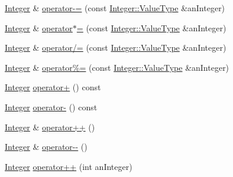 \begin{DoxyCompactItemize}
\item 
\mbox{\hyperlink{classlibrary_1_1core_1_1types_1_1_integer}{Integer}} \& \mbox{\hyperlink{classlibrary_1_1core_1_1types_1_1_integer_a3976d02296b294db2aa1b70164764fbc}{operator-\/=}} (const \mbox{\hyperlink{classlibrary_1_1core_1_1types_1_1_integer_a623afb1580f870fd8a1997b1c12c917d}{Integer\+::\+Value\+Type}} \&an\+Integer)
\item 
\mbox{\hyperlink{classlibrary_1_1core_1_1types_1_1_integer}{Integer}} \& \mbox{\hyperlink{classlibrary_1_1core_1_1types_1_1_integer_ac08d655daf7d75b22909e14aed294e7e}{operator$\ast$=}} (const \mbox{\hyperlink{classlibrary_1_1core_1_1types_1_1_integer_a623afb1580f870fd8a1997b1c12c917d}{Integer\+::\+Value\+Type}} \&an\+Integer)
\item 
\mbox{\hyperlink{classlibrary_1_1core_1_1types_1_1_integer}{Integer}} \& \mbox{\hyperlink{classlibrary_1_1core_1_1types_1_1_integer_a5358ac7b2be0f83ebd2fccb1e9593e24}{operator/=}} (const \mbox{\hyperlink{classlibrary_1_1core_1_1types_1_1_integer_a623afb1580f870fd8a1997b1c12c917d}{Integer\+::\+Value\+Type}} \&an\+Integer)
\item 
\mbox{\hyperlink{classlibrary_1_1core_1_1types_1_1_integer}{Integer}} \& \mbox{\hyperlink{classlibrary_1_1core_1_1types_1_1_integer_a88482e4677001d7d523f90ef28ac95f6}{operator\%=}} (const \mbox{\hyperlink{classlibrary_1_1core_1_1types_1_1_integer_a623afb1580f870fd8a1997b1c12c917d}{Integer\+::\+Value\+Type}} \&an\+Integer)
\item 
\mbox{\hyperlink{classlibrary_1_1core_1_1types_1_1_integer}{Integer}} \mbox{\hyperlink{classlibrary_1_1core_1_1types_1_1_integer_adaf665cd81d9befd1f764e11c2be9b69}{operator+}} () const
\item 
\mbox{\hyperlink{classlibrary_1_1core_1_1types_1_1_integer}{Integer}} \mbox{\hyperlink{classlibrary_1_1core_1_1types_1_1_integer_ad9670b50ae46bc0f09e4995e445dab99}{operator-\/}} () const
\item 
\mbox{\hyperlink{classlibrary_1_1core_1_1types_1_1_integer}{Integer}} \& \mbox{\hyperlink{classlibrary_1_1core_1_1types_1_1_integer_a5b6a30696dcea44bcf29e4bd0a01f490}{operator++}} ()
\item 
\mbox{\hyperlink{classlibrary_1_1core_1_1types_1_1_integer}{Integer}} \& \mbox{\hyperlink{classlibrary_1_1core_1_1types_1_1_integer_aa57a45cc369f42e8a5f98391e26b6549}{operator-\/-\/}} ()
\item 
\mbox{\hyperlink{classlibrary_1_1core_1_1types_1_1_integer}{Integer}} \mbox{\hyperlink{classlibrary_1_1core_1_1types_1_1_integer_a10dd68fe912b11ba68840f9c1fdb6ffa}{operator++}} (int an\+Integer)

\end{DoxyCompactItemize}
